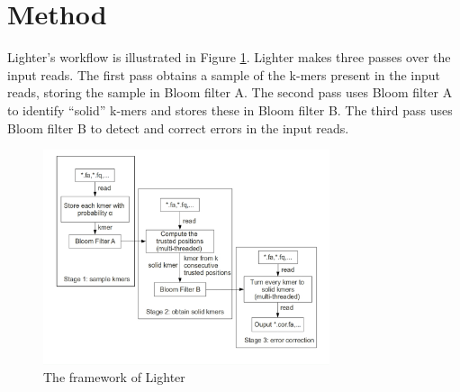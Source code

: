 \documentclass[10pt]{article}
\begin{document}

\section*{Method}
Lighter's workflow is illustrated in Figure \ref{fig:lighter_framework}. Lighter makes three passes over the input reads.  The first pass obtains a sample of the k-mers present in the input reads, storing the sample in Bloom filter A.  The second pass uses Bloom filter A to identify ``solid'' k-mers and stores these in Bloom filter B.  The third pass uses Bloom filter B to detect and correct errors in the input reads.

\begin{figure}[h!]
\begin{center}
\includegraphics[width=0.75\textwidth]{lighter_framework.jpg}
\caption{The framework of Lighter\label{fig:lighter_framework}}
\end{center}
\end{figure}
\end{document}
